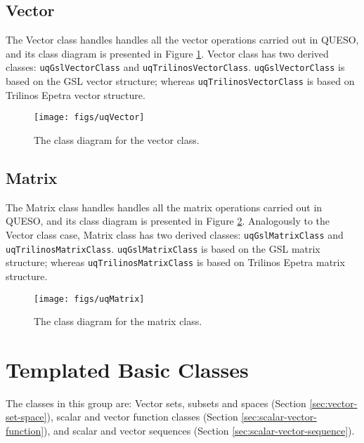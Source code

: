   

\subsection{Vector}


The Vector class handles handles all the vector operations carried out in QUESO, and its class diagram is presented in Figure \ref{fig-vector-class}.
Vector class has two derived classes: \verb+uqGslVectorClass+ and \verb+uqTrilinosVectorClass+. \verb+uqGslVectorClass+ is based on the GSL vector structure; whereas \verb+uqTrilinosVectorClass+ is based on Trilinos Epetra vector structure.


\begin{figure}[!hpt]
\centering
\texttt{[image: figs/uqVector]}
\vspace*{-8pt}
\caption{ The class diagram for the vector class.}
\label{fig-vector-class}
\end{figure}



\subsection{Matrix}


The Matrix class handles handles all the matrix operations carried out in QUESO, and its class diagram is presented in Figure \ref{fig-matrix-class}. Analogously to the Vector class case,
Matrix class has two derived classes: \verb+uqGslMatrixClass+ and \verb+uqTrilinosMatrixClass+. \verb+uqGslMatrixClass+ is based on the GSL matrix structure; whereas \verb+uqTrilinosMatrixClass+ is based on Trilinos Epetra matrix structure.


\begin{figure}[!hp]
\centering
\texttt{[image: figs/uqMatrix]}
\vspace*{-8pt}
\caption{The class diagram for the matrix class.}
\label{fig-matrix-class}
\end{figure}


\section{Templated Basic Classes}
The classes in this group are: Vector sets, subsets and spaces (Section \ref{sec:vector-set-space}), scalar and vector function classes (Section \ref{sec:scalar-vector-function}), and scalar and vector sequences (Section \ref{sec:scalar-vector-sequence}).

